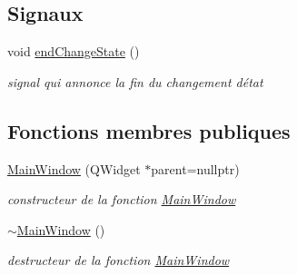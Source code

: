 \subsection*{Signaux}
\begin{DoxyCompactItemize}
\item 
void \hyperlink{classMainWindow_a2cd7fd54c497cd6a073ad43857266890}{end\+Change\+State} ()
\begin{DoxyCompactList}\small\item\em signal qui annonce la fin du changement d\textquotesingle{}état \end{DoxyCompactList}\end{DoxyCompactItemize}
\subsection*{Fonctions membres publiques}
\begin{DoxyCompactItemize}
\item 
\hyperlink{classMainWindow_a996c5a2b6f77944776856f08ec30858d}{Main\+Window} (Q\+Widget $\ast$parent=nullptr)
\begin{DoxyCompactList}\small\item\em constructeur de la fonction \hyperlink{classMainWindow}{Main\+Window} \end{DoxyCompactList}\item 
\hyperlink{classMainWindow_ae98d00a93bc118200eeef9f9bba1dba7}{$\sim$\+Main\+Window} ()
\begin{DoxyCompactList}\small\item\em destructeur de la fonction \hyperlink{classMainWindow}{Main\+Window} \end{DoxyCompactList}\end{DoxyCompactItemize}
